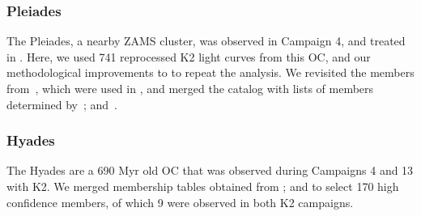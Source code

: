 \documentclass{aa}
\begin{document}
\subsubsection{Pleiades}
The Pleiades, a nearby ZAMS cluster, was observed in Campaign 4, and treated in . Here, we used 741 reprocessed K2 light curves from this OC, and our methodological improvements to  to repeat the analysis. We revisited the members from~\citet{rebull_rotation_2016}, which were used in , and merged the catalog with lists of members determined by~\citet{olivares_pleiades_2018, gaia_dr2_2018_hrd}; and~\citet{cantat_gaudin_2018}.
\subsubsection{Hyades}
The Hyades are a 690 Myr old OC that was observed during Campaigns 4 and 13 with K2.  We merged membership tables obtained from \citet{douglas_praesepe_hyades_2014, reino_hyades_2018}; and \citet{gaia_dr2_2018_hrd} to select 170 high confidence members, of which 9 were observed in both K2 campaigns. 
\end{document}
